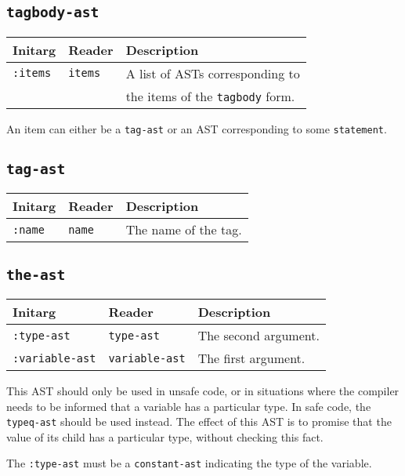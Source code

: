 \subsection{\texttt{tagbody-ast}}
\label{tagbody-ast}

\begin{tabular}{|l|l|l|}
\hline
Initarg & Reader & Description\\
\hline\hline
\texttt{:items} & \texttt{items} & A list of ASTs corresponding to\\
& & the items of the \texttt{tagbody} form. \\
\hline
\end{tabular}

An item can either be a \texttt{tag-ast} or an AST corresponding to
some \texttt{statement}. 

\subsection{\texttt{tag-ast}}
\label{tag-ast}

\begin{tabular}{|l|l|l|}
\hline
Initarg & Reader & Description\\
\hline\hline
\texttt{:name} & \texttt{name} & The name of the tag.\\
\hline
\end{tabular}

\subsection{\texttt{the-ast}}
\label{the-ast}

\begin{tabular}{|l|l|l|}
\hline
Initarg & Reader & Description\\
\hline\hline
\texttt{:type-ast} & \texttt{type-ast} & The second argument.\\
\hline
\texttt{:variable-ast} & \texttt{variable-ast} & The first argument.\\
\hline
\end{tabular}

This AST should only be used in unsafe code, or in situations where
the compiler needs to be informed that a variable has a particular
type.  In safe code, the \texttt{typeq-ast}  should
be used instead.  The effect of this AST is to promise that the value
of its child has a particular type, without checking this fact.

The \texttt{:type-ast} must be a \texttt{constant-ast} indicating the
type of the variable.


